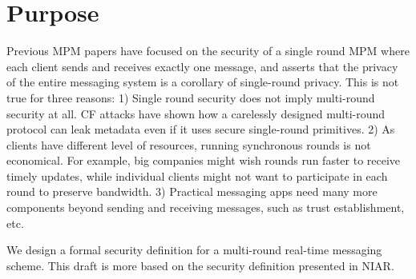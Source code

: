 \section{Purpose}
Previous MPM papers have focused on the security of a single round MPM where each client sends and receives exactly one message, and asserts that the privacy of the entire messaging system is a corollary of single-round privacy. This is not true for three reasons: 1) Single round security does not imply multi-round security at all. CF attacks have shown how a carelessly designed multi-round protocol can leak metadata even if it uses secure single-round primitives. 2) As clients have different level of resources, running synchronous rounds is not economical. For example, big companies might wish rounds run faster to receive timely updates, while individual clients might not want to participate in each round to preserve bandwidth. 3) Practical messaging apps need many more components beyond sending and receiving messages, such as trust establishment, etc. 

We design a formal security definition for a multi-round real-time messaging scheme. This draft is more based on the security definition presented in NIAR. 



